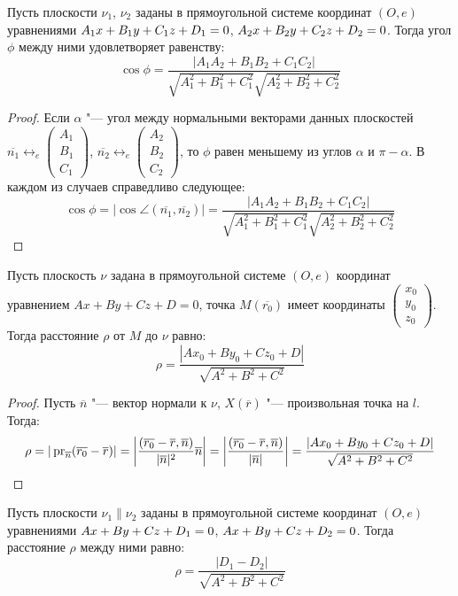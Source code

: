 \begin{proposition}
	Пусть плоскости $\nu_1$, $\nu_2$ заданы в прямоугольной системе координат $(O, e)$ уравнениями $A_1x\hm{+}B_1y+C_1z+D_1=0$, $A_2x\hm{+}B_2y\hm{+}C_2z+D_2=0$. Тогда угол $\phi$ между ними удовлетворяет равенству:
	\[\cos{\phi} = \frac{|A_1A_2+B_1B_2+C_1C_2|}{\sqrt{A_1^2+B_1^2+C_1^2}\sqrt{A_2^2+B_2^2+C_2^2}}\]
\end{proposition}

\begin{proof}
	Если $\alpha$ "--- угол между нормальными векторами данных плоскостей $\overline{n_1} \leftrightarrow_{e} \begin{pmatrix}A_1\\B_1\\C_1\end{pmatrix}$, $\overline{n_2} \leftrightarrow_{e} \begin{pmatrix}A_2\\B_2\\C_2\end{pmatrix}$, то $\phi$ равен меньшему из углов $\alpha$ и $\pi - \alpha$. В каждом из случаев справедливо следующее:
	\[\cos{\phi} = |\cos{\angle(\overline{n_1}, \overline{n_2})}| = \frac{|A_1A_2+B_1B_2+C_1C_2|}{\sqrt{A_1^2+B_1^2+C_1^2}\sqrt{A_2^2+B_2^2+C_2^2}}\]
\end{proof}

\begin{proposition}
	Пусть плоскость $\nu$ задана в прямоугольной системе $(O, e)$ координат уравнением $Ax+By+Cz+D=0$, точка $M(\overline{r_0})$ имеет координаты $\begin{pmatrix}x_0\\y_0\\z_0\end{pmatrix}$. Тогда расстояние $\rho$ от $M$ до $\nu$ равно:
	\[\rho = \frac{|Ax_0 + By_0 + Cz_0+D|}{\sqrt{A^2 + B^2+C^2}}\]
\end{proposition}

\begin{proof}
	Пусть $\overline{n}$ "--- вектор нормали к $\nu$, $X(\overline{r})$ "--- произвольная точка на $l$. Тогда:
	\[\rho = |\operatorname{pr}_{\overline{n}}(\overline{r_0} - \overline{r})| = \left|\frac{(\overline{r_0} - \overline{r}, \overline{n})}{|\overline{n}|^2}\overline{n}\right| = \left|\frac{(\overline{r_0} - \overline{r}, \overline{n})}{|\overline{n}|}\right| = \frac{|Ax_0 + By_0 + Cz_0+D|}{\sqrt{A^2 + B^2+C^2}}\]
\end{proof}

\begin{proposition}
	Пусть плоскости $\nu_1 \parallel \nu_2$ заданы в прямоугольной системе координат $(O, e)$ уравнениями $Ax+By+Cz\hm{+}D_1=0$, $Ax\hm{+}By\hm{+}Cz+D_2=0$. Тогда расстояние $\rho$ между ними равно:
	\[\rho = \frac{|D_1 - D_2|}{\sqrt{A^2 + B^2 + C^2}}\]
\end{proposition}

